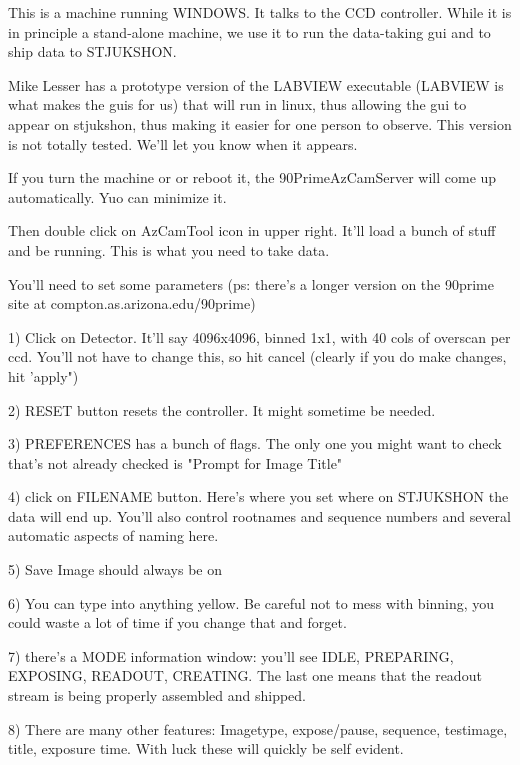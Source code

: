 \documentclass[letterpaper,12pt]{article}
\begin{document}
     This is a machine running WINDOWS. It talks to the CCD
     controller. While it is in principle a stand-alone
     machine, we use it to run the data-taking gui and to
     ship data to STJUKSHON.

     Mike Lesser has a prototype version of the LABVIEW executable
     (LABVIEW is what makes the guis for us) that will run in linux,
     thus allowing the gui to appear on stjukshon, thus making
     it easier for one person to observe. This version is not totally
     tested. We'll let you know when it appears.



     If you turn the machine or or reboot it, the 90PrimeAzCamServer
     will come up automatically. Yuo can minimize it.

     Then double click on AzCamTool icon in upper right. It'll
     load a bunch of stuff and be running. This is what you need
     to take data.

     You'll need to set some parameters (ps: there's a longer version
     on the 90prime site at compton.as.arizona.edu/90prime)

     1) Click on Detector. It'll say 4096x4096, binned 1x1, with 40 cols
        of overscan per ccd. You'll not have to change this, so
        hit cancel (clearly if you do make changes, hit 'apply")

     2) RESET button resets the controller. It might sometime be
        needed.

     3) PREFERENCES has a bunch of flags. The only one you might
        want to check that's not already checked is "Prompt
        for Image Title"

     4) click on FILENAME button.
        Here's where you set where on STJUKSHON the data will end up.
        You'll also control rootnames and sequence numbers and several
        automatic aspects of naming here.

     5) Save Image should always be on

     6) You can type into anything yellow. Be careful not to mess with
        binning, you could waste a lot of time if you change that
        and forget.

     7) there's a MODE information window:
        you'll see IDLE, PREPARING, EXPOSING, READOUT, CREATING.
        The last one means that the readout stream is being properly
         assembled and shipped.

     8) There are many other features: Imagetype, expose/pause,
        sequence, testimage, title, exposure time. With luck these
        will quickly be self evident.
\end{document}
